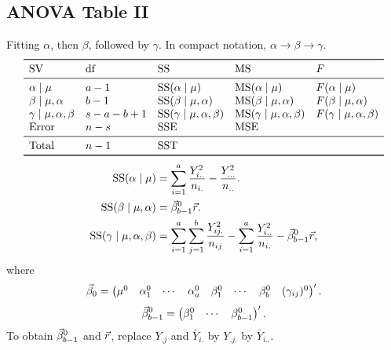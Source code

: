 \subsection*{ANOVA Table II}
Fitting $ \alpha $, then $ \beta $, followed by $ \gamma $. In compact notation,
$ \alpha\to\beta\to \gamma $.
\[ \begin{array}{lllll}
        \toprule
        \text{SV}                   & \text{df} & \text{SS}                              & \text{MS}                              & F                              \\
        \midrule
        \alpha\mid \mu              & a-1       & \text{SS}(\alpha\mid \mu)              & \text{MS}(\alpha\mid \mu)              & F(\alpha\mid \mu)              \\
        \beta\mid \mu,\alpha        & b-1       & \text{SS}(\beta\mid \mu,\alpha)        & \text{MS}(\beta\mid \mu,\alpha)        & F(\beta\mid \mu,\alpha)        \\

        \gamma\mid \mu,\alpha,\beta & s-a-b+1   & \text{SS}(\gamma\mid \mu,\alpha,\beta) & \text{MS}(\gamma\mid \mu,\alpha,\beta) & F(\gamma\mid \mu,\alpha,\beta) \\
        \text{Error}                & n-s       & \SSE                                   & \MSE                                                                    \\
        \midrule
        \text{Total}                & n-1       & \SST                                                                                                             \\
        \bottomrule
    \end{array} \]
\begin{align*}
    \text{SS}(\alpha\mid \mu)              & =\sum_{i=1}^{a}\frac{Y_{i..}^2}{n_{i.}}-\frac{Y_{...}^2}{n_{..}}.                                                               \\
    \text{SS}(\beta\mid \mu,\alpha)        & =\vec{\beta}_{b-1}^0 \vec{r}.                                                                                             \\
    \text{SS}(\gamma\mid \mu,\alpha,\beta) & =\sum_{i=1}^{a}\sum_{j=1}^{b}\frac{Y_{ij.}^2}{n_{ij}}-\sum_{i=1}^{a}\frac{Y_{i..}^2}{n_{i.}}-\vec{\beta}_{b-1}^0 \vec{r},
\end{align*}
where
\[ \vec{\beta}_0=\begin{pmatrix}
        \mu^0 & \alpha_1^0 & \cdots & \alpha_a^0 & \beta_1^0 & \cdots & \beta_b^0 & (\gamma_{ij})^0
    \end{pmatrix}'. \]
\[ \vec{\beta}_{b-1}^0=\begin{pmatrix}
        \beta_1^0 & \cdots & \beta_{b-1}^0
    \end{pmatrix}'. \]
To obtain $ \vec{\beta}_{b-1}^0 $ and $ \vec{r} $,
replace $ Y_{.j} $ and $ \bar{Y}_{i.} $ by
$ Y_{.j.} $ by $ \bar{Y}_{i..} $.
